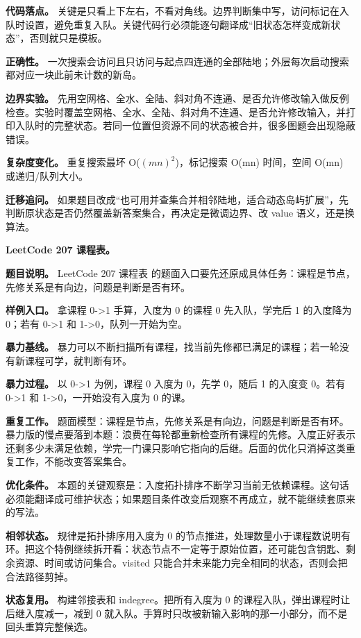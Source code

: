 \textbf{代码落点。} 关键是只看上下左右，不看对角线。边界判断集中写，访问标记在入队时设置，避免重复入队。关键代码行必须能逐句翻译成“旧状态怎样变成新状态”，否则就只是模板。

\textbf{正确性。} 一次搜索会访问且只访问与起点四连通的全部陆地；外层每次启动搜索都对应一块此前未计数的新岛。

\textbf{边界实验。} 先用空网格、全水、全陆、斜对角不连通、是否允许修改输入做反例检查。实验时覆盖空网格、全水、全陆、斜对角不连通、是否允许修改输入，并打印入队时的完整状态。若同一位置但资源不同的状态被合并，很多图题会出现隐蔽错误。

\textbf{复杂度变化。} 重复搜索最坏 O(\ensuremath{(mn)^{2}})，标记搜索 O(mn) 时间，空间 O(mn) 或递归/队列大小。

\textbf{迁移追问。} 如果题目改成“也可用并查集合并相邻陆地，适合动态岛屿扩展”，先判断原状态是否仍然覆盖新答案集合，再决定是微调边界、改 value 语义，还是换算法。

\noindent\textbf{LeetCode 207 课程表。}

\textbf{题目说明。} LeetCode 207 课程表 的题面入口要先还原成具体任务：课程是节点，先修关系是有向边，问题是判断是否有环。

\textbf{样例入口。} 拿课程 0->1 手算，入度为 0 的课程 0 先入队，学完后 1 的入度降为 0；若有 0->1 和 1->0，队列一开始为空。

\textbf{暴力基线。} 暴力可以不断扫描所有课程，找当前先修都已满足的课程；若一轮没有新课程可学，就判断有环。

\textbf{暴力过程。} 以 0->1 为例，课程 0 入度为 0，先学 0，随后 1 的入度变 0。若有 0->1 和 1->0，一开始没有入度为 0 的课。

\textbf{重复工作。} 题面模型：课程是节点，先修关系是有向边，问题是判断是否有环。暴力版的慢点要落到本题：浪费在每轮都重新检查所有课程的先修。入度正好表示还剩多少未满足依赖，学完一门课只影响它指向的后继。后面的优化只消掉这类重复工作，不能改变答案集合。

\textbf{优化条件。} 本题的关键观察是：入度拓扑排序不断学习当前无依赖课程。这句话必须能翻译成可维护状态；如果题目条件改变后观察不再成立，就不能继续套原来的写法。

\textbf{相邻状态。} 规律是拓扑排序用入度为 0 的节点推进，处理数量小于课程数说明有环。把这个特例继续拆开看：状态节点不一定等于原始位置，还可能包含钥匙、剩余资源、时间或访问集合。visited 只能合并未来能力完全相同的状态，否则会把合法路径剪掉。

\textbf{状态复用。} 构建邻接表和 indegree。把所有入度为 0 的课程入队，弹出课程时让后继入度减一，减到 0 就入队。手算时只改被新输入影响的那一小部分，而不是回头重算完整候选。

